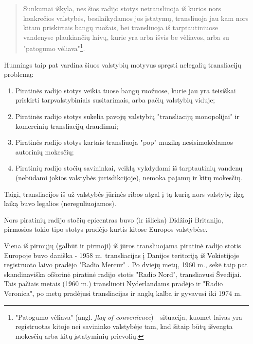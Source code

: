 \documentclass[kursinis-darbas]{vukf}
\begin{document}
\begin{quotation}
	Sunkumai iškyla, nes šios radijo stotys netransliuoja iš kurios nors konkrečios valstybės, besilaikydamos jos įstatymų, transliuoja jau kam nors kitam priskirtais bangų ruožais, bei transliuoja iš tarptautiniuose vandenyse plaukiančių laivų, kurie yra arba išvis be vėliavos, arba su "patogumo vėliava"\footnote{"Patogumo vėliava" (angl. \emph{flag of convenience}) - situacija, kuomet laivas yra registruotas kitoje nei savininko valstybėje tam, kad šitaip būtų išvengta mokesčių arba kitų įstatyminių prievolių.}.
\end{quotation}

Hunnings taip pat vardina šiuos valstybių motyvus spręsti nelegalių transliacijų problemą:

\begin{enumerate}
	\item Piratinės radijo stotys veikia tuose bangų ruožuose, kurie jau yra teisiškai priskirti tarpvalstybiniais susitarimais, arba pačių valstybių viduje;
	\item Piratinės radijo stotys sukelia pavojų valstybių "transliacijų monopolijai" ir komercinių transliacijų draudimui;
	\item Piratinės radijo stotys kartais transliuoja "pop" muziką nesisimokėdamos autorinių mokesčių;
	\item Piratinių radijo stočių savininkai, veiklą vykdydami iš tarptautinių vandenų (nebūdami jokios valstybės jurisdikcijoje), nemoka pajamų ir kitų mokesčių.
\end{enumerate}

Taigi, transliacijos iš už valstybės jūrinės ribos atgal į tą kurią nors valstybę ilgą laiką buvo legalios (nereguliuojamos).

Nors piratinių radijo stočių epicentras buvo (ir išlieka) Didžioji Britanija, pirmosios tokio tipo stotys pradėjo kurtis kitose Europos valstybėse.

Viena iš pirmųjų (galbūt ir pirmoji) iš jūros transliuojama piratinė radijo stotis Europoje buvo daniška - 1958 m. transliacijas į Danijos teritoriją iš Vokietijoje registruoto laivo \cite[p.~447]{js_continuum_encyclopedia} pradėjo "Radio Mercur" \cite[p.~237]{chs_encyclopedia_of_radio} \cite{hn_radio_mercur_when_mercury_got_wings} \cite[p.~447]{js_continuum_encyclopedia}. Po dviejų metų, 1960 m., sekė taip pat skandinaviška ofšorinė piratinė radijo stotis "Radio Nord", transliavusi Švedijai. Tais pačiais metais (1960 m.) transliuoti Nyderlandams pradėjo ir "Radio Veronica", po metų pradėjusi transliacijas ir anglų kalba ir gyvavusi iki 1974 m.
\end{document}
